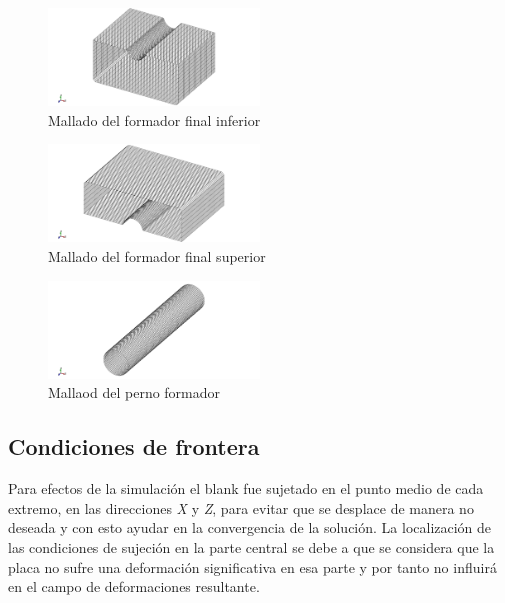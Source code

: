 \begin{figure}[!h]
\centering
\includegraphics[width=0.5\textwidth]{src/ch3/mesh_ffi.png}
\caption{Mallado del formador final inferior}
\label{fig:mesh_ffi}
\end{figure}

\begin{figure}[!h]
\centering
\includegraphics[width=0.5\textwidth]{src/ch3/mesh_ffs.png}
\caption{Mallado del formador final superior}
\label{fig:mesh_ffs}
\end{figure}

\begin{figure}[!h]
\centering
\includegraphics[width=0.5\textwidth]{src/ch3/mesh_perno.png}
\caption{Mallaod del perno formador}
\label{fig:mesh_perno}
\end{figure}


\subsection{Condiciones de frontera}

Para efectos de la simulación el blank fue sujetado en el punto medio de cada extremo, 
en las direcciones \textit{X} y \textit{Z}, para evitar que se desplace de manera no 
deseada y con esto ayudar en la convergencia de la solución. La localización de las 
condiciones de sujeción en la parte central se debe a que se considera que la placa 
no sufre una deformación significativa en esa parte y por tanto no influirá en el campo 
de deformaciones resultante. \\

